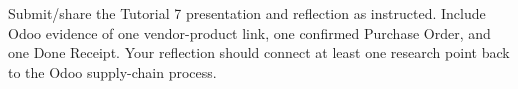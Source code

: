 \begin{labdeliverable}
Submit/share the Tutorial 7 presentation and reflection as instructed. Include Odoo evidence of one vendor-product link, one confirmed Purchase Order, and one Done Receipt. Your reflection should connect at least one research point back to the Odoo supply-chain process.
\end{labdeliverable}
